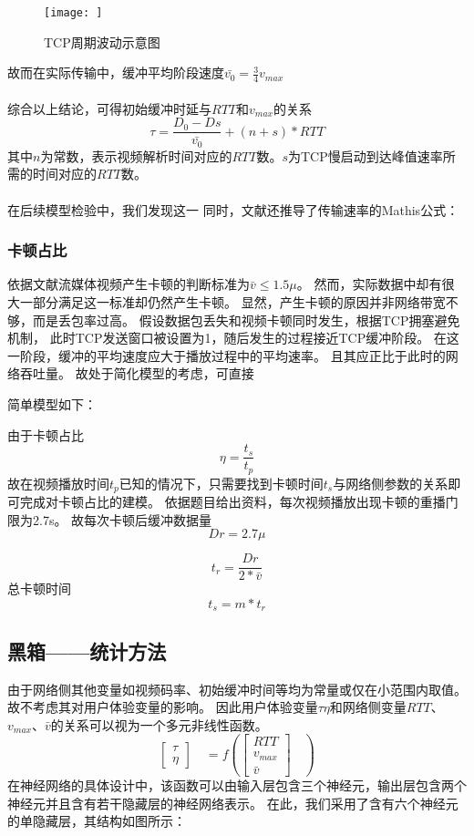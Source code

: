 \documentclass[UTF8]{ctexart}
\begin{document}
\begin{figure}
    \centering
    \texttt{[image: ]}
    \caption{TCP周期波动示意图}
\end{figure}
故而在实际传输中，缓冲平均阶段速度$\bar{v_{0}}=\frac{3}{4}v_{max}$

\paragraph{}综合以上结论，可得初始缓冲时延与$RTT$和$v_{max}$的关系
\begin{equation}
    \tau = \frac{D_{0}-Ds}{\bar{v_{0}}} + (n+s)*RTT
\end{equation}
其中$n$为常数，表示视频解析时间对应的$RTT$数。$s$为TCP慢启动到达峰值速率所需的时间对应的$RTT$数。
\paragraph{}
在后续模型检验中，我们发现这一
同时，文献还推导了传输速率的Mathis公式：

\subsubsection{卡顿占比}
依据文献\cite{}流媒体视频产生卡顿的判断标准为$\bar{v}\leq1.5\mu$。
然而，实际数据中却有很大一部分满足这一标准却仍然产生卡顿。
显然，产生卡顿的原因并非网络带宽不够，而是丢包率过高。
假设数据包丢失和视频卡顿同时发生，根据TCP拥塞避免机制，
此时TCP发送窗口被设置为1，随后发生的过程接近TCP缓冲阶段。
在这一阶段，缓冲的平均速度应大于播放过程中的平均速率。
且其应正比于此时的网络吞吐量。
故处于简化模型的考虑，可直接

简单模型如下：

由于卡顿占比
\[\eta=\frac{t_{s}}{t_{p}}\]
故在视频播放时间$t_{p}$已知的情况下，只需要找到卡顿时间$t_{s}$与网络侧参数的关系即可完成对卡顿占比的建模。
依据题目给出资料，每次视频播放出现卡顿的重播门限为2.7s。
故每次卡顿后缓冲数据量
\[Dr=2.7\mu\]

\[t_{r}=\frac{Dr}{2*\bar{v}}\]
总卡顿时间\[t_{s}=m*t_{r}\]

\subsection{黑箱——统计方法}
由于网络侧其他变量如视频码率、初始缓冲时间等均为常量或仅在小范围内取值。
故不考虑其对用户体验变量的影响。
因此用户体验变量$\tau$$\eta$和网络侧变量$RTT$、$v_{max}$、$\bar{v}$的关系可以视为一个多元非线性函数。
\begin{equation}
    \begin{bmatrix} \tau\\\eta \end{bmatrix} \quad=f(\begin{bmatrix} RTT\\v_{max}\\\bar
    {v} \end{bmatrix} \quad)
\end{equation}
在神经网络的具体设计中，该函数可以由输入层包含三个神经元，输出层包含两个神经元并且含有若干隐藏层的神经网络表示。
在此，我们采用了含有六个神经元的单隐藏层，其结构如图所示：
\end{document}
